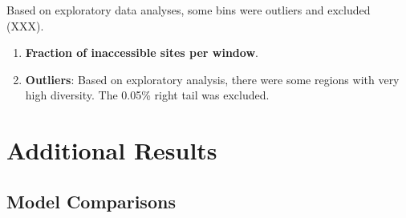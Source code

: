 \documentclass[11pt]{article}
\begin{document}
Based on exploratory data analyses, some bins were outliers and
excluded (XXX). 



\begin{enumerate}
  \item \textbf{Fraction of inaccessible sites per window}.  

  \item \textbf{Outliers}: Based on exploratory analysis, there were some
    regions with very high diversity. The 0.05\% right tail was excluded.

\end{enumerate}



\section*{Additional Results}

\subsection*{Model Comparisons}
\end{document}
